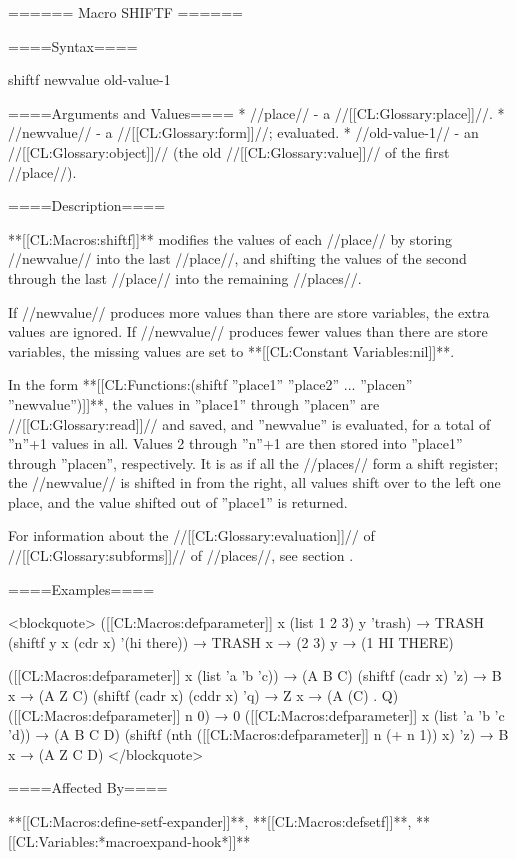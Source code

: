 ====== Macro SHIFTF ======

====Syntax====

\DefmacWithValues shiftf { newvalue} {old-value-1}

====Arguments and Values====
  * //place// - a //[[CL:Glossary:place]]//.
  * //newvalue// - a //[[CL:Glossary:form]]//; evaluated.
  * //old-value-1// - an //[[CL:Glossary:object]]// (the old //[[CL:Glossary:value]]// of the first //place//).

====Description====

**[[CL:Macros:shiftf]]** modifies the values of each //place// by storing //newvalue// into the last //place//, and shifting the values of the second through the last //place// into the remaining //places//.

If //newvalue// produces more values than there are store variables, the extra values are ignored. If //newvalue// produces fewer values than there are store variables, the missing values are set to **[[CL:Constant Variables:nil]]**.

In the form **[[CL:Functions:(shiftf ''place1'' ''place2'' ... ''placen'' ''newvalue'')]]**, the values in ''place1'' through ''placen'' are //[[CL:Glossary:read]]// and saved, and ''newvalue'' is evaluated, for a total of ''n''+1 values in all. Values 2 through ''n''+1 are then stored into ''place1'' through ''placen'', respectively. It is as if all the //places// form a shift register; the //newvalue// is shifted in from the right, all values shift over to the left one place, and the value shifted out of ''place1'' is returned.

For information about the //[[CL:Glossary:evaluation]]// of //[[CL:Glossary:subforms]]// of //places//, see section {\secref\GenRefSubFormEval}.

====Examples====

<blockquote> ([[CL:Macros:defparameter]] x (list 1 2 3) y 'trash) → TRASH (shiftf y x (cdr x) '(hi there)) → TRASH x → (2 3) y → (1 HI THERE)

([[CL:Macros:defparameter]] x (list 'a 'b 'c)) → (A B C) (shiftf (cadr x) 'z) → B x → (A Z C) (shiftf (cadr x) (cddr x) 'q) → Z x → (A (C) . Q) ([[CL:Macros:defparameter]] n 0) → 0 ([[CL:Macros:defparameter]] x (list 'a 'b 'c 'd)) → (A B C D) (shiftf (nth ([[CL:Macros:defparameter]] n (+ n 1)) x) 'z) → B x → (A Z C D) </blockquote>

====Affected By====

**[[CL:Macros:define-setf-expander]]**, **[[CL:Macros:defsetf]]**, **[[CL:Variables:*macroexpand-hook*]]**

